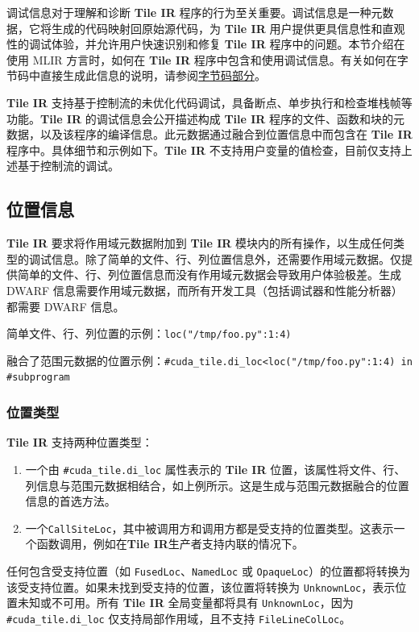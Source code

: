 \documentclass{article}
\begin{document}
调试信息对于理解和诊断 \textbf{Tile IR} 程序的行为至关重要。调试信息是一种元数据，它将生成的代码映射回原始源代码，为 \textbf{Tile IR} 用户提供更具信息性和直观性的调试体验，并允许用户快速识别和修复 \textbf{Tile IR} 程序中的问题。本节介绍在使用 MLIR 方言时，如何在 \textbf{Tile IR} 程序中包含和使用调试信息。有关如何在字节码中直接生成此信息的说明，请参阅\href{https://docs.nvidia.com/cuda/tile-ir/latest/sections/bytecode.html#section-bytecode}{字节码部分}。



\textbf{Tile IR} 支持基于控制流的未优化代码调试，具备断点、单步执行和检查堆栈帧等功能。\textbf{Tile IR} 的调试信息会公开描述构成 \textbf{Tile IR} 程序的文件、函数和块的元数据，以及该程序的编译信息。此元数据通过融合到位置信息中而包含在 \textbf{Tile IR} 程序中。具体细节和示例如下。\textbf{Tile IR} 不支持用户变量的值检查，目前仅支持上述基于控制流的调试。



\subsection{位置信息}


\textbf{Tile IR} 要求将作用域元数据附加到 \textbf{Tile IR} 模块内的所有操作，以生成任何类型的调试信息。除了简单的文件、行、列位置信息外，还需要作用域元数据。仅提供简单的文件、行、列位置信息而没有作用域元数据会导致用户体验极差。生成 DWARF 信息需要作用域元数据，而所有开发工具（包括调试器和性能分析器）都需要 DWARF 信息。



简单文件、行、列位置的示例：\texttt{loc("/tmp/foo.py":1:4)}



融合了范围元数据的位置示例：\texttt{\#cuda\_tile.di\_loc<loc("/tmp/foo.py":1:4) in \#subprogram}



\subsubsection{位置类型}


\textbf{Tile IR} 支持两种位置类型：



\begin{enumerate}
\item 一个由 \texttt{\#cuda\_tile.di\_loc} 属性表示的 \textbf{Tile IR} 位置，该属性将文件、行、列信息与范围元数据相结合，如上例所示。这是生成与范围元数据融合的位置信息的首选方法。
\item 一个\texttt{CallSiteLoc}，其中被调用方和调用方都是受支持的位置类型。这表示一个函数调用，例如在\textbf{Tile IR}生产者支持内联的情况下。


\end{enumerate}
任何包含受支持位置（如 \texttt{FusedLoc}、\texttt{NamedLoc} 或 \texttt{OpaqueLoc}）的位置都将转换为该受支持位置。如果未找到受支持的位置，该位置将转换为 \texttt{UnknownLoc}，表示位置未知或不可用。所有 \textbf{Tile IR} 全局变量都将具有 \texttt{UnknownLoc}，因为 \texttt{\#cuda\_tile.di\_loc} 仅支持局部作用域，且不支持 \texttt{FileLineColLoc}。
\end{document}
